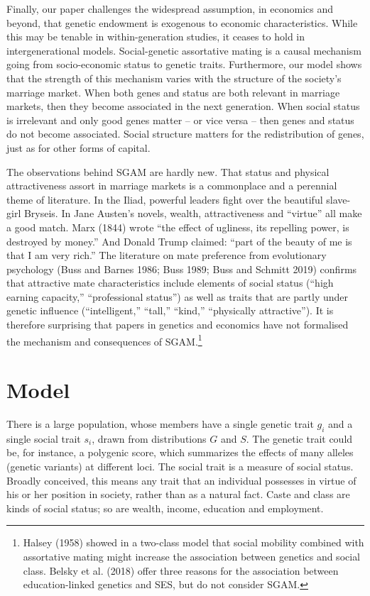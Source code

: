 \documentclass[
]{article}
\begin{document}
Finally, our paper challenges the widespread assumption, in economics and
beyond, that genetic endowment is exogenous to economic characteristics. While
this may be tenable in within-generation studies, it ceases to hold in
intergenerational models. Social-genetic assortative mating is a causal
mechanism going from socio-economic status to genetic traits. Furthermore, our
model shows that the strength of this mechanism varies with the structure of the
society's marriage market. When both genes and status are both relevant in
marriage markets, then they become associated in the next generation. When
social status is irrelevant and only good genes matter -- or vice versa -- then
genes and status do not become associated. Social structure matters for the
redistribution of genes, just as for other forms of capital.

The observations behind SGAM are hardly new. That status and physical
attractiveness assort in marriage markets is a commonplace and a perennial theme
of literature. In the Iliad, powerful leaders fight over the beautiful
slave-girl Bryseis. In Jane Austen's novels, wealth, attractiveness and ``virtue''
all make a good match. Marx (1844) wrote ``the effect of ugliness, its repelling
power, is destroyed by money.'' And Donald Trump claimed: ``part of the beauty of
me is that I am very rich.'' The literature on mate preference from evolutionary
psychology (Buss and Barnes 1986; Buss 1989; Buss and Schmitt 2019) confirms
that attractive mate characteristics include elements of social status (``high
earning capacity,'' ``professional status'') as well as traits that are partly
under genetic influence (``intelligent,'' ``tall,'' ``kind,'' ``physically
attractive''). It is therefore surprising that papers in genetics and economics
have not formalised the mechanism and consequences of SGAM.\footnote{Halsey (1958) showed in a two-class model that social
  mobility combined with assortative mating might increase the association between
  genetics and social class. Belsky et al. (2018) offer three reasons for the
  association between education-linked genetics and SES, but do not consider SGAM.}

\hypertarget{model}{%
\section{Model}\label{model}}

There is a large population, whose members have a single genetic trait
\(g_{i}\) and a single social trait \(s_{i}\), drawn from distributions \(G\)
and \(S\). The genetic trait could be, for instance, a polygenic score,
which summarizes the effects of many alleles (genetic variants) at
different loci. The social trait is a measure of social status. Broadly
conceived, this means any trait that an individual possesses in virtue
of his or her position in society, rather than as a natural fact. Caste
and class are kinds of social status; so are wealth, income, education
and employment.
\end{document}
